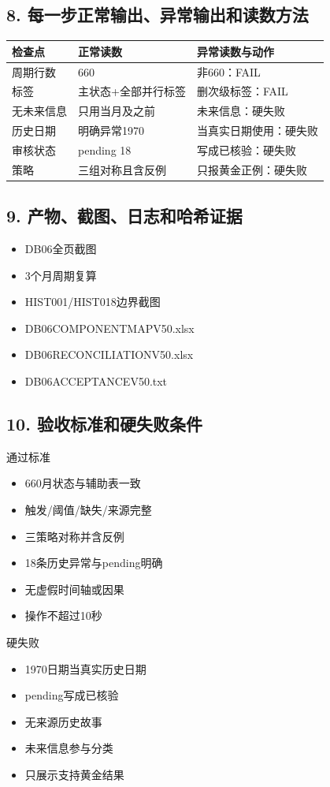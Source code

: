 \documentclass[UTF8,openany,zihao=-4]{ctexbook}
\renewcommand{\_}{\textunderscore\allowbreak}
\begin{document}
\subsection*{8. 每一步正常输出、异常输出和读数方法}
\noindent\begin{tabularx}{\textwidth}{@{}p{}XX@{}}
\toprule
\textbf{检查点} & \textbf{正常读数} & \textbf{异常读数与动作} \\
\midrule
周期行数 & 660 & 非660：FAIL \\
标签 & 主状态+全部并行标签 & 删次级标签：FAIL \\
无未来信息 & 只用当月及之前 & 未来信息：硬失败 \\
历史日期 & 明确异常1970 & 当真实日期使用：硬失败 \\
审核状态 & pending 18 & 写成已核验：硬失败 \\
策略 & 三组对称且含反例 & 只报黄金正例：硬失败 \\
\bottomrule
\end{tabularx}

\subsection*{9. 产物、截图、日志和哈希证据}
\begin{itemize}[label=$\square$]
\item DB06全页截图
\item 3个月周期复算
\item HIST001/HIST018边界截图
\item DB06\_COMPONENT\_MAP\_V50.xlsx
\item DB06\_RECONCILIATION\_V50.xlsx
\item DB06\_ACCEPTANCE\_V50.txt
\end{itemize}

\subsection*{10. 验收标准和硬失败条件}
\begin{statusbox}{通过标准}
\begin{itemize}[label=$\square$]
\item 660月状态与辅助表一致
\item 触发/阈值/缺失/来源完整
\item 三策略对称并含反例
\item 18条历史异常与pending明确
\item 无虚假时间轴或因果
\item 操作不超过10秒
\end{itemize}
\end{statusbox}
\begin{dangerbox}{硬失败}
\begin{itemize}
\item 1970日期当真实历史日期
\item pending写成已核验
\item 无来源历史故事
\item 未来信息参与分类
\item 只展示支持黄金结果
\end{itemize}
\end{dangerbox}
\end{document}

